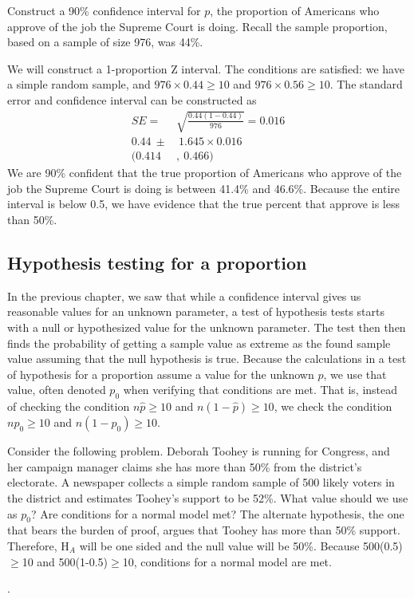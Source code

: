 \begin{example}{Construct a 90\% confidence interval for $p$, the proportion of Americans who approve of the job the Supreme Court is doing.  Recall the sample proportion, based on a sample of size 976, was 44\%.}\label{90CIForJobSupremeCourtDoingExample}

We will construct a 1-proportion Z interval. The conditions are satisfied: we have a simple random sample, and $976 \times 0.44 \geq 10$ and $976 \times 0.56 \geq 10$. The standard error and confidence interval can be constructed as
\begin{align*}
SE =& \sqrt{\frac{0.44(1-0.44)}{976}} = 0.016 \\
0.44\ \pm&\  1.645 \times 0.016 \\
(0.414&,\ 0.466)
\end{align*}
We are 90\% confident that the true proportion of Americans who approve of the job the Supreme Court is doing is between 41.4\% and 46.6\%. Because the entire interval is below 0.5, we have evidence that the true percent that approve is less than 50\%.
\end{example}



\subsection{Hypothesis testing for a proportion}
\label{htForPropSection}


In the previous chapter, we saw that while a confidence interval gives us reasonable values for an unknown parameter, a test of hypothesis tests starts with a null or hypothesized value for the unknown parameter.  The test then then finds the probability of getting a sample value as extreme as the found sample value assuming that the null hypothesis is true.  Because the calculations in a test of hypothesis for a proportion assume a value for the unknown $p$, we use that value, often denoted $p_{0}$ when verifying that conditions are met.  That is, instead of checking the condition $n\hat{p} \geq10$ and $n(1-\hat{p})\geq10$, we check the condition $np_0\geq10$ and $n(1-p_0)\geq10$.  

\begin{example}{Consider the following problem.  Deborah Toohey is running for Congress, and her campaign manager claims she has more than 50\% from the district's electorate.  A newspaper collects a simple random sample of 500 likely voters in the district and estimates Toohey's support to be 52\%.  What value should we use as $p_{0}$?  Are conditions for a normal model met?}
The alternate hypothesis, the one that bears the burden of proof, argues that Toohey has more than 50\% support.  Therefore, H$_A$ will be one sided and the null value will be 50\%.  Because 500(0.5)$\geq$10 and 500(1-0.5)$\geq$10, conditions for a normal model are met.
\end{example}.

